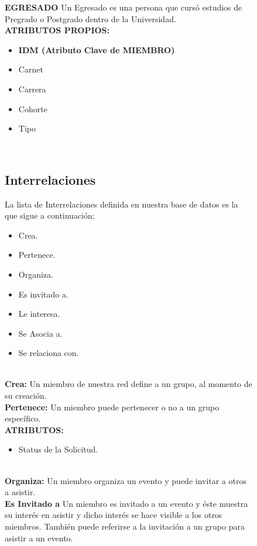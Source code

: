 \documentclass{article}
\begin{document}
\begin{figure}[h]
{\bf{EGRESADO}}
	Un Egresado es una persona que curs\'o estudios de Pregrado o Postgrado dentro de la Universidad.\\
\newline
{\bf{ATRIBUTOS PROPIOS:}}
\newline
\begin{itemize}
 \item {\bf{IDM (Atributo Clave de MIEMBRO)}}
\item Carnet
\item Carrera
\item Cohorte
\item Tipo
\end{itemize}\\
\newline

\subsection{Interrelaciones}
	La lista de Interrelaciones definida en nuestra base de datos es la que sigue a continuaci\'on:\\
\begin{itemize}
\item Crea.
\item Pertenece.
\item Organiza.
\item Es invitado a.
\item Le interesa.
\item Se Asocia a.
\item Se relaciona con.\\
\end{itemize}\\
\newline
{\bf{Crea:}} Un miembro de nuestra red define a un grupo, al momento de su creaci\'on.\\
{\bf{Pertenece:}} Un miembro puede pertenecer o no  a un grupo espec\'ifico.\\
\newline
{\bf{ATRIBUTOS:}} 
\begin{itemize}
\item Status de la Solicitud.\\
\end{itemize}\\
\newline
{\bf{Organiza:}} Un miembro organiza un evento y puede invitar a otros a asistir.\\
{\bf{Es Invitado a}} Un miembro es invitado a un evento y \'este muestra su inter\'es en asistir y dicho inter\'es se hace visible a los otros miembros. Tambi\'en puede referirse a la invitaci\'on a un grupo para asistir a un evento.\\

\end{figure}
\end{document}
